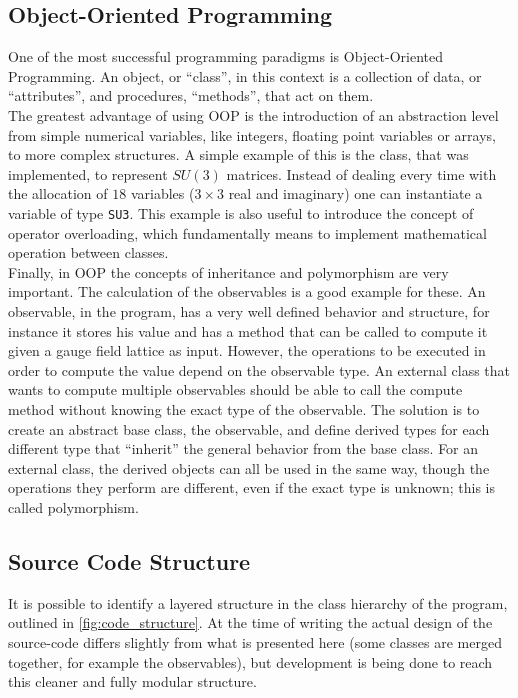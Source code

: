 \subsection{Object-Oriented Programming}
One of the most successful programming paradigms is Object-Oriented Programming. An object, or ``class'', in this context is a collection of data, or ``attributes'', and procedures, ``methods'', that act on them. \\
The greatest advantage of using OOP is the introduction of an abstraction level from simple numerical variables, like integers, floating point variables or arrays, to more complex structures. A simple example of this is the class, that was implemented, to represent $SU(3)$ matrices. Instead of dealing every time with the allocation of $18$ variables ($3\times 3$ real and imaginary) one can instantiate a variable of type \texttt{SU3}. This example is also useful to introduce the concept of operator overloading, which fundamentally means to implement mathematical operation between classes.\\
Finally, in OOP the concepts of inheritance and polymorphism are very important. The calculation of the observables is a good example for these. An observable, in the program, has a very well defined behavior and structure, for instance it stores his value and has a method that can be called to compute it given a gauge field lattice as input. However, the operations to be executed in order to compute the value depend on the observable type. An external class that wants to compute multiple observables should be able to call the compute method without knowing the exact type of the observable. The solution is to create an abstract base class, the observable, and define derived types for each different type that ``inherit'' the general behavior from the base class. For an external class, the derived objects can all be used in the same way, though the operations they perform are different, even if the exact type is unknown; this is called polymorphism.\\

\subsection{Source Code Structure}
It is possible to identify a layered structure in the class hierarchy of the program, outlined in \cref{fig:code_structure}. At the time of writing the actual design of the source-code  differs slightly from what is presented here (some classes are merged together, for example the observables), but development is being done to reach this cleaner and fully modular structure.\\


